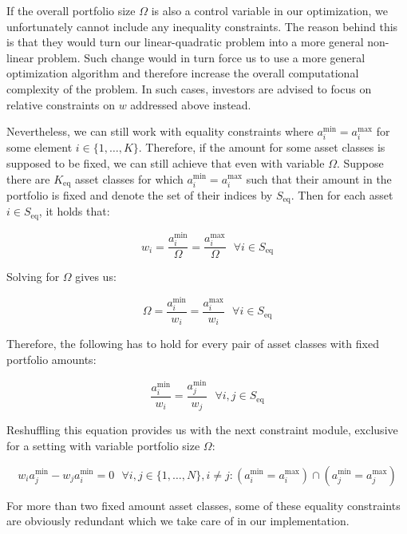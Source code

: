 If the overall portfolio size $\Omega$ is also a control variable in our optimization, we unfortunately cannot include any inequality constraints. The reason behind this is that they would turn our linear-quadratic problem into a more general non-linear problem. Such change would in turn force us to use a more general optimization algorithm and therefore increase the overall computational complexity of the problem. In such cases, investors are advised to focus on relative constraints on $w$ addressed above instead.

Nevertheless, we can still work with equality constraints where $a^{\min}_i = a^{\max}_i$ for some element $i\in\{1,\ldots,K\}$. Therefore, if the amount for some asset classes is supposed to be fixed, we can still achieve that even with variable $\Omega$. Suppose there are $K_{\text{eq}}$ asset classes for which $a^{\min}_i = a^{\max}_i$ such that their amount in the portfolio is fixed and denote the set of their indices by $S_{\text{eq}}$. Then for each asset $i\in S_{\text{eq}}$, it holds that:

\begin{equation}
w_i = \frac{a^{\min}_i}{\Omega} = \frac{a^{\max}_i}{\Omega} \ \ \  \forall i\in S_{\text{eq}}
\end{equation}

Solving for $\Omega$ gives us:

\begin{equation}
\Omega = \frac{a^{\min}_i}{w_i} = \frac{a^{\max}_i}{w_i} \ \ \   \forall i\in S_{\text{eq}}
\end{equation}

Therefore, the following has to hold for every pair of asset classes with fixed portfolio amounts:

\begin{equation}
\frac{a^{\min}_i}{w_i} = \frac{a^{\min}_j}{w_j}\ \ \   \forall i,j \in S_{\text{eq}}
\end{equation}

Reshuffling this equation provides us with the next constraint module, exclusive for a setting with variable portfolio size $\Omega$:

\begin{equation}
w_i a^{\min}_j - w_j a^{\min}_i = 0 \ \ \   \forall i,j\in\{1,\ldots,N\}, i\neq j : (a^{\min}_i = a^{\max}_i) \cap (a^{\min}_j = a^{\max}_j) \tag{M4V} \label{eq:portfolio_optimization:M4V}
\end{equation}

For more than two fixed amount asset classes, some of these equality constraints are obviously redundant which we take care of in our implementation.

